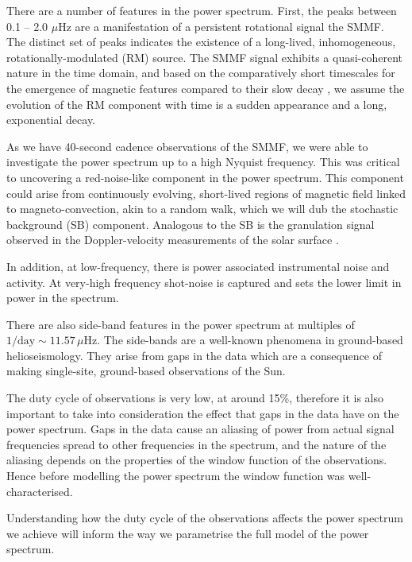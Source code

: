 There are a number of features in the power spectrum. First, the peaks between 0.1 -- 2.0 $\mu\mathrm{Hz}$ are a manifestation of a persistent rotational signal the SMMF. The distinct set of peaks indicates the existence of a long-lived, inhomogeneous, rotationally-modulated (RM) source. The SMMF signal exhibits a quasi-coherent nature in the time domain, and based on the comparatively short timescales for the emergence of magnetic features compared to their slow decay \citep{zwaan_solar_1981, harvey_properties_1993, hathaway_sunspot_2008}, we assume the evolution of the RM component with time is a sudden appearance and a long, exponential decay.

As we have 40-second cadence observations of the SMMF, we were able to investigate the power spectrum up to a high Nyquist frequency. This was critical to uncovering a red-noise-like component in the power spectrum. This component could arise from continuously evolving, short-lived regions of magnetic field linked to magneto-convection, akin to a random walk, which we will dub the stochastic background (SB) component. Analogous to the SB is the granulation signal observed in the Doppler-velocity measurements of the solar surface \citep{basu_asteroseismic_2017}. 

In addition, at low-frequency, there is power associated instrumental noise and activity. At very-high frequency shot-noise is captured and sets the lower limit in power in the spectrum. 

There are also side-band features in the power spectrum at multiples of $1/\mathrm{day} \sim 11.57 \, \mu\mathrm{Hz}$. The side-bands are a well-known phenomena in ground-based helioseismology. They arise from gaps in the data which are a consequence of making single-site, ground-based observations of the Sun.

The duty cycle of observations is very low, at around 15\%, therefore it is also important to take into consideration the effect that gaps in the data have on the power spectrum. Gaps in the data cause an aliasing of power from actual signal frequencies spread to other frequencies in the spectrum, and the nature of the aliasing depends on the properties of the window function of the observations. Hence before modelling the power spectrum the window function was well-characterised.

Understanding how the duty cycle of the observations affects the power spectrum we achieve will inform the way we parametrise the full model of the power spectrum.


